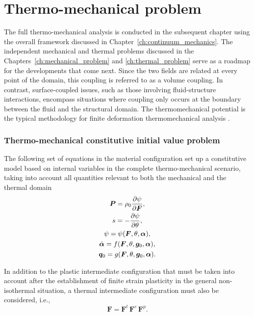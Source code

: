 \chapter{Thermo-mechanical problem}
\label{ch:thermo_mechanical_problem}

The full thermo-mechanical analysis is conducted in the subsequent chapter using the overall framework discussed in Chapter~\ref{ch:continuum_mechanics}.
The independent mechanical and thermal problems discussed in the Chapters~\ref{ch:mechanical_problem} and \ref{ch:thermal_problem} serve as a roadmap for the developments that come next.
Since the two fields are related at every point of the domain, this coupling is referred to as a volume coupling.
In contrast, surface-coupled issues, such as those involving fluid-structure interactions, encompass situations where coupling only occurs at the boundary between the fluid and the structural domain.
The thermomechanical potential is the typical methodology for finite deformation thermomechanical analysis \citep{danowski_computational_2014}.



\subsection{Thermo-mechanical constitutive initial value problem}

The following set of equations in the material configuration set up a constitutive model based on internal variables in the complete thermo-mechanical scenario, taking into account all quantities relevant to both the mechanical and the thermal domain
    \begin{gather}
        \bm{P} = \rho_0 \frac{\partial \psi}{\partial \bm{F}},\\
        s = - \frac{\partial \psi}{\partial \theta},\\
        \psi = \psi(\bm{F},\theta, \bm{\alpha}),\label{eq:thermo_mech_helmholtz_free_energy}\\
        \dot{\bm \alpha} = f(\bm{F}, \theta, \bm g_0,\bm \alpha),\\
        \bm q_0 = g(\bm F, \theta, \bm g_0, \bm \alpha).
    \end{gather}

In addition to the plastic intermediate configuration that must be taken into account after the establishment of finite strain plasticity in the general non-isothermal situation, a thermal intermediate configuration must also be considered, i.e.,
\begin{equation}
  \bm F = \bm F^t\,\bm F^e\,\bm F^p.
\end{equation}

